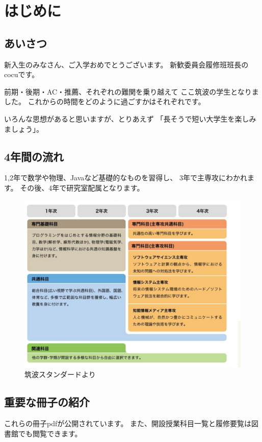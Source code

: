 \documentclass[a4j]{jsarticle}
\begin{document}
\newpage


\section{はじめに}


\subsection{あいさつ}
新入生のみなさん、ご入学おめでとうございます。
新歓委員会履修班班長のcocuです。

前期・後期・AC・推薦、それぞれの難関を乗り越えて
ここ筑波の学生となりました。
これからの時間をどのように過ごすかはそれぞれです。

いろんな思想があると思いますが、とりあえず
「長そうで短い大学生を楽しみましょう」。


\subsection{4年間の流れ}
1,2年で数学や物理、Javaなど基礎的なものを習得し、
3年で主専攻にわかれます。
その後、4年で研究室配属となります。
\vspace{5mm}
\begin{figure}[H]
\begin{center}
\includegraphics[width=\textwidth]{pic/01-introduction/hoge.eps}
\caption{筑波スタンダードより}
\end{center}
\end{figure}

\newpage
\vspace*{-12mm}
\subsection{重要な冊子の紹介}
これらの冊子pdfが公開されています。
また、開設授業科目一覧と履修要覧は図書館でも閲覧できます。
\end{document}

